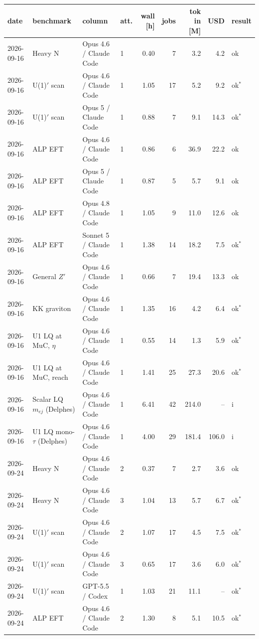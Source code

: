 \begin{longtable}{llllrrrrl}
\toprule
date & benchmark & column & att. & wall [h] & jobs & tok in [M] & USD & result \\
\midrule
\endhead
2026-09-16 & Heavy N & Opus 4.6 / Claude Code & 1 & 0.40 & 7 & 3.2 & 4.2 & ok \\
2026-09-16 & U(1)$'$ scan & Opus 4.6 / Claude Code & 1 & 1.05 & 17 & 5.2 & 9.2 & ok$^{*}$ \\
2026-09-16 & U(1)$'$ scan & Opus 5 / Claude Code & 1 & 0.88 & 7 & 9.1 & 14.3 & ok$^{*}$ \\
2026-09-16 & ALP EFT & Opus 4.6 / Claude Code & 1 & 0.86 & 6 & 36.9 & 22.2 & ok \\
2026-09-16 & ALP EFT & Opus 5 / Claude Code & 1 & 0.87 & 5 & 5.7 & 9.1 & ok \\
2026-09-16 & ALP EFT & Opus 4.8 / Claude Code & 1 & 1.05 & 9 & 11.0 & 12.6 & ok \\
2026-09-16 & ALP EFT & Sonnet 5 / Claude Code & 1 & 1.38 & 14 & 18.2 & 7.5 & ok$^{*}$ \\
2026-09-16 & General $Z'$ & Opus 4.6 / Claude Code & 1 & 0.66 & 7 & 19.4 & 13.3 & ok \\
2026-09-16 & KK graviton & Opus 4.6 / Claude Code & 1 & 1.35 & 16 & 4.2 & 6.4 & ok$^{*}$ \\
2026-09-16 & U1 LQ at MuC, $\eta$ & Opus 4.6 / Claude Code & 1 & 0.55 & 14 & 1.3 & 5.9 & ok$^{*}$ \\
2026-09-16 & U1 LQ at MuC, reach & Opus 4.6 / Claude Code & 1 & 1.41 & 25 & 27.3 & 20.6 & ok$^{*}$ \\
2026-09-16 & Scalar LQ $m_{ej}$ (Delphes) & Opus 4.6 / Claude Code & 1 & 6.41 & 42 & 214.0 & -- & i \\
2026-09-16 & U1 LQ mono-$\tau$ (Delphes) & Opus 4.6 / Claude Code & 1 & 4.00 & 29 & 181.4 & 106.0 & i \\
2026-09-24 & Heavy N & Opus 4.6 / Claude Code & 2 & 0.37 & 7 & 2.7 & 3.6 & ok \\
2026-09-24 & Heavy N & Opus 4.6 / Claude Code & 3 & 1.04 & 13 & 5.7 & 6.7 & ok$^{*}$ \\
2026-09-24 & U(1)$'$ scan & Opus 4.6 / Claude Code & 2 & 1.07 & 17 & 4.5 & 7.5 & ok$^{*}$ \\
2026-09-24 & U(1)$'$ scan & Opus 4.6 / Claude Code & 3 & 0.65 & 17 & 3.6 & 6.0 & ok$^{*}$ \\
2026-09-24 & U(1)$'$ scan & GPT-5.5 / Codex & 1 & 1.03 & 21 & 11.1 & -- & ok$^{*}$ \\
2026-09-24 & ALP EFT & Opus 4.6 / Claude Code & 2 & 1.30 & 8 & 5.1 & 10.5 & ok$^{*}$ \\

\end{longtable}
